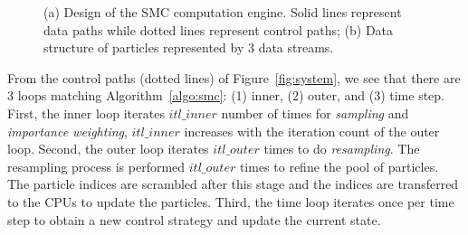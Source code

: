 \setcounter{subfigure}{0}
\begin{figure}[t!]
\centering
{}
\caption{(a) Design of the SMC computation engine. Solid lines represent data paths while dotted lines represent control paths; (b) Data structure of particles represented by 3 data streams.}
\end{figure}

From the control paths (dotted lines) of Figure~\ref{fig:system}, we see that there are 3 loops matching Algorithm~\ref{algo:smc}: 
(1) inner, (2) outer, and (3) time step.
First, the inner loop iterates $itl\_inner$ number of times for \textit{sampling} and \textit{importance weighting},
$itl\_inner$ increases with the iteration count of the outer loop.
Second, the outer loop iterates $itl\_outer$ times to do \textit{resampling}.
The resampling process is performed $itl\_outer$ times to refine the pool of particles.
The particle indices are scrambled after this stage and the indices are transferred to the CPUs to update the particles.
Third, the time loop iterates once per time step to obtain a new control strategy and update the current state.

